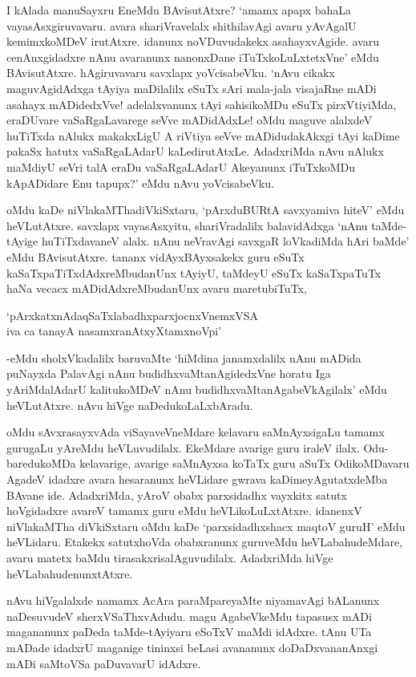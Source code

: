 I kAlada manuSayxru EneMdu BAvisutAtxre? `amamx apapx bahaLa vayasAsxgiruvavaru. avara shariVravelalx shithilavAgi avaru yAvAgalU kemimxkoMDeV irutAtxre. idanunx noVDuvudakekx asahayxvAgide. avaru cenAnxgidadxre nAnu avaranunx nanonxDane iTuTxkoLuLxtetxVne' eMdu BAvisutAtxre. hAgiruvavaru savxlapx yoVcisabeVku. `nAvu cikakx maguvAgidAdxga tAyiya maDilalilx eSuTx sAri mala-jala visajaRne mADi asahayx mADidedxVve! adelalxvanunx tAyi sahisikoMDu eSuTx pirxVtiyiMda, eraDUvare vaSaRgaLavarege seVve mADidAdxLe! oMdu maguve alalxdeV huTiTxda nAlukx makakxLigU A riVtiya seVve mADidudakAkxgi tAyi kaDime pakaSx hatutx vaSaRgaLAdarU kaLedirutAtxLe. AdadxriMda nAvu nAlukx maMdiyU seVri talA eraDu vaSaRgaLAdarU Akeyanunx iTuTxkoMDu kApADidare Enu tapupx?' eMdu nAvu yoVcisabeVku.

oMdu kaDe niVlakaMThadiVkiSxtaru, `pArxduBURtA savxyamiva hiteV' eMdu heVLutAtxre. savxlapx vayasAsxyitu, shariVradalilx balavidAdxga `nAnu taMde-tAyige huTiTxdavaneV alalx. nAnu neVravAgi savxgaR loVkadiMda hAri baMde' eMdu BAvisutAtxre. tananx vidAyxBAyxsakekx guru eSuTx kaSaTxpaTiTxdAdxreMbudanUnx tAyiyU, taMdeyU eSuTx kaSaTxpaTuTx haNa vecacx mADidAdxreMbudanUnx avaru maretubiTuTx,

\begin{shloka}
`pArxkatxnAdaqSaTxlabadhxparxjocnxVnemxVSA\\
iva ca tanayA nasamxranAtxyXtamxnoV\s pi'
\end{shloka}

-eMdu sholxVkadalilx baruvaMte `hiMdina janamxdalilx nAnu mADida puNayxda PalavAgi nAnu budidhxvaMtanAgidedxVne horatu Iga yAriMdalAdarU kalitukoMDeV nAnu budidhxvaMtanAgabeVkAgilalx' eMdu heVLutAtxre. nAvu hiVge naDedukoLaLxbAradu.

oMdu sAvxrasayxvAda viSayaveVneMdare kelavaru saMnAyxsigaLu tamamx gurugaLu yAreMdu heVLuvudilalx. EkeMdare avarige guru iraleV ilalx. Odu-baredukoMDa kelavarige, avarige saMnAyxsa koTaTx guru aSuTx OdikoMDavaru AgadeV idadxre avara hesaranunx heVLidare gwrava kaDimeyAgutatxdeMba BAvane ide. AdadxriMda, yAroV obabx parxsidadhx vayxkitx satutx hoVgidadxre avareV tamamx guru eMdu heVLikoLuLxtAtxre. idanenxV niVlakaMTha diVkiSxtaru oMdu kaDe `parxsidadhxshacx maqtoV guruH' eMdu heVLidaru. Etakekx satutxhoVda obabxranunx guruveMdu heVLabahudeMdare, avaru matetx baMdu tirasakxrisalAguvudilalx. AdadxriMda hiVge heVLabahudenunxtAtxre.

nAvu hiVgalalxde namamx AcAra paraMpareyaMte niyamavAgi bALanunx naDesuvudeV sherxVSaThxvAdudu. magu AgabeVkeMdu tapasusx mADi magananunx paDeda taMde-tAyiyaru eSoTxV maMdi idAdxre. tAnu UTa mADade idadxrU maganige tininxsi beLasi avananunx doDaDxvananAnxgi mADi saMtoVSa paDuvavarU idAdxre.

